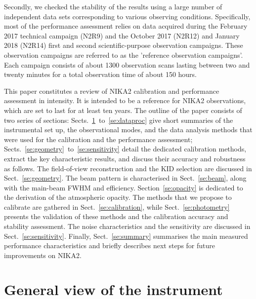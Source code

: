 \documentclass[traditionalabstract]{aa}
\newcommand{\lp}[1]{#1}
\begin{document}
Secondly, we checked the stability of the results using a large number of
independent data sets corresponding to various observing conditions.
Specifically, most of the performance assessment relies on data
acquired during the February 2017 technical campaign (N2R9) and the
October 2017 (N2R12) and January 2018 (N2R14) first and second
scientific-purpose observation campaigns. {\lp These observation
campaigns are referred to as the 'reference observation campaigns'.}
Each campaign consists of about 1300 observation scans lasting between
two and twenty minutes for a total observation time of about 150 hours. 

This paper constitutes a review of NIKA2 calibration and
performance assessment in intensity. It is intended to be a reference
for NIKA2 observations, which are set to last for at least ten years. 
The outline of the paper consists of two series of sections:
Sects.~\ref{se:instru}~to~\ref{se:dataproc} give short summaries of the
instrumental set up, the observational modes, and the data analysis methods
that were used for the calibration and the performance
assessment; Sects.~\ref{se:geometry}~to~\ref{se:sensitivity} detail the
dedicated calibration methods, extract the key characteristic results,
and discuss their accuracy and robustness as follows. The field-of-view
reconstruction and the KID selection are discussed
in Sect.~\ref{se:geometry}. The beam pattern is characterised in
Sect.~\ref{se:beam}, along with the main-beam
FWHM and efficiency. Section~\ref{se:opacity} is dedicated to the derivation of
the atmospheric opacity. The methods that we propose to
calibrate are gathered in Sect.~\ref{se:calibration}, while
Sect.~\ref{se:photometry} presents the validation of these methods and
the calibration accuracy and stability assessment. The noise
characteristics and the sensitivity are discussed in
Sect.~\ref{se:sensitivity}. Finally, Sect.~\ref{se:summary} summarises
the main measured performance characteristics and {\lp briefly
describes next steps for future improvements on NIKA2.}


\section{General view of the instrument}
\label{se:instru}
%
\end{document}

